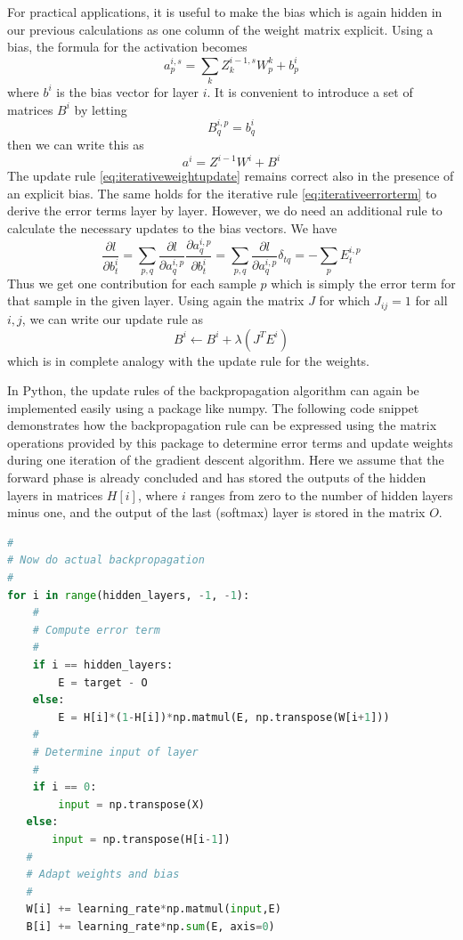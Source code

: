 \documentclass[a4paper, draft]{report}
\numberwithin{section}{chapter}
\numberwithin{equation}{chapter}
\theoremstyle{own}
\theoremstyle{remark}
\begin{document}
For practical applications, it is useful to make the bias which is again hidden in our previous calculations as one column of the weight matrix explicit. Using a bias, the formula for the activation becomes
$$
a^{i,s}_p = \sum_k Z^{i-1,s}_k W^k_p + b^i_p
$$
where $b^i$ is the bias vector for layer $i$. It is convenient to introduce a set of matrices $B^i$ by letting
$$
B^{i,p}_q = b^i_q
$$
then we can write this as
$$
a^i = Z^{i-1} W^i + B^i
$$
The update rule \eqref{eq:iterativeweightupdate} remains correct also in the presence of an explicit bias. The same holds for the iterative rule \eqref{eq:iterativeerrorterm} to derive the error terms layer by layer. However, we do need an additional rule to calculate the necessary updates to the bias vectors. We have 
$$
\frac{\partial l}{\partial b^i_t} = \sum_{p,q} \frac{\partial l}{\partial a^{i,p}_q} \frac{\partial a^{i,p}_q}{\partial b^i_t} = \sum_{p,q} \frac{\partial l}{\partial a^{i,p}_q} \delta_{tq} = - \sum_p E^{i,p}_t
$$
Thus we get one contribution for each sample $p$ which is simply the error term for that sample in the given layer. Using again the matrix $J$ for which $J_{ij} = 1$ for all $i,j$, we can write our update rule as
$$
B^i \leftarrow B^i + \lambda (J^T  E^i)
$$
which is in complete analogy with the update rule for the weights.

In Python, the update rules of the backpropagation algorithm can again be implemented easily using a package like numpy. The following code snippet demonstrates how the backpropagation rule can be expressed using the matrix operations provided by this package to determine error terms
and update weights during one iteration of the gradient descent algorithm. Here we assume that the forward phase is already concluded and has stored the outputs of the hidden layers in matrices $H[i]$, where $i$ ranges from zero to the number of hidden layers minus one, and the output
of the last (softmax) layer is stored in the matrix $O$. 

\begin{lstlisting}[frame=single,language=Python,caption=Backpropagation in Python]
#
# Now do actual backpropagation
#
for i in range(hidden_layers, -1, -1):
    # 
    # Compute error term
    # 
    if i == hidden_layers:
        E = target - O
    else:
        E = H[i]*(1-H[i])*np.matmul(E, np.transpose(W[i+1]))
    #
    # Determine input of layer
    #
    if i == 0:
        input = np.transpose(X)
   else:
       input = np.transpose(H[i-1])
   # 
   # Adapt weights and bias
   #
   W[i] += learning_rate*np.matmul(input,E)
   B[i] += learning_rate*np.sum(E, axis=0)
\end{lstlisting}
\end{document}
